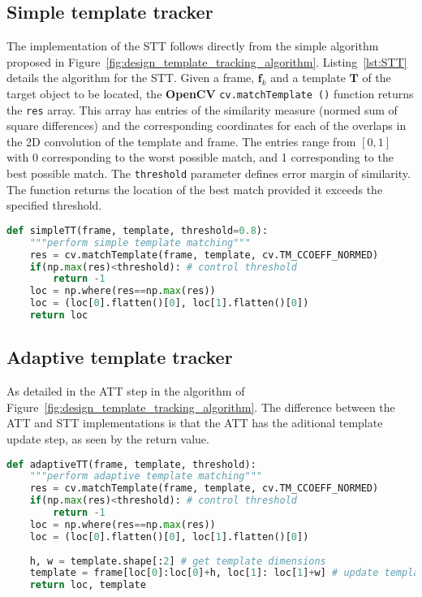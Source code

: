 \subsection{Simple template tracker}
The implementation of the STT follows directly from the simple algorithm
proposed in Figure~\ref{fig:design_template_tracking_algorithm}.
Listing~\ref{lst:STT} details the algorithm for the STT\@. Given a frame,
$\mathbf{f}_k$ and a
template $\mathbf{T}$ of the target object to be located, the \textbf{OpenCV} \lstinline{cv.matchTemplate ()} function
returns the \lstinline{res} array. This array has entries of the similarity
measure (normed sum of square differences) and the
corresponding coordinates for each of the overlaps in the 2D convolution of the
template and frame. The entries range from $\left[ 0,1 \right]$ with 0
corresponding to the worst possible match, and 1 corresponding to the best
possible match. The \lstinline{threshold} parameter defines error margin of
similarity. 
The function returns the location of the best match provided it exceeds the
specified threshold.

\begin{lstlisting}[language=Python, caption={STT tracking loop}, captionpos=b, label={lst:STT}]
def simpleTT(frame, template, threshold=0.8):
    """perform simple template matching"""
    res = cv.matchTemplate(frame, template, cv.TM_CCOEFF_NORMED)
    if(np.max(res)<threshold): # control threshold
        return -1
    loc = np.where(res==np.max(res))
    loc = (loc[0].flatten()[0], loc[1].flatten()[0])        
    return loc
\end{lstlisting}

\subsection{Adaptive template tracker}
As detailed in the ATT step in the algorithm of Figure~\ref{fig:design_template_tracking_algorithm}.
The difference between the ATT and STT implementations is that the ATT has the
aditional template update step, as seen by the return value.

\begin{lstlisting}[language=Python, caption={ATT tracking loop}, captionpos=b, label={lst:ATT}]
def adaptiveTT(frame, template, threshold):
    """perform adaptive template matching"""
    res = cv.matchTemplate(frame, template, cv.TM_CCOEFF_NORMED)
    if(np.max(res)<threshold): # control threshold
        return -1
    loc = np.where(res==np.max(res))
    loc = (loc[0].flatten()[0], loc[1].flatten()[0])        
    
    h, w = template.shape[:2] # get template dimensions
    template = frame[loc[0]:loc[0]+h, loc[1]: loc[1]+w] # update template
    return loc, template
\end{lstlisting}

